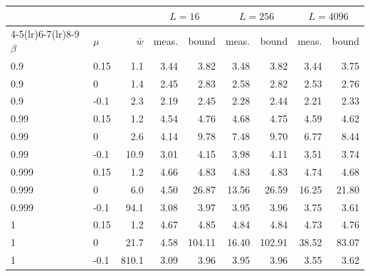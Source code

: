\begin{tabular}{llrrrrrrr}
\toprule
 & & & \multicolumn{2}{c}{$L=16$} & \multicolumn{2}{c}{$L=256$} & \multicolumn{2}{c}{$L=4096$}\\
\cmidrule(lr){4-5}\cmidrule(lr){6-7}\cmidrule(lr){8-9}
$\beta$ & $\mu$ & $\bar w$ & meas. & bound & meas. & bound & meas. & bound\\
\midrule
0.9 & 0.15 & 1.1 & 3.44 & 3.82 & 3.48 & 3.82 & 3.44 & 3.75\\
0.9 & 0 & 1.4 & 2.45 & 2.83 & 2.58 & 2.82 & 2.53 & 2.76\\
0.9 & -0.1 & 2.3 & 2.19 & 2.45 & 2.28 & 2.44 & 2.21 & 2.33\\
0.99 & 0.15 & 1.2 & 4.54 & 4.76 & 4.68 & 4.75 & 4.59 & 4.62\\
0.99 & 0 & 2.6 & 4.14 & 9.78 & 7.48 & 9.70 & 6.77 & 8.44\\
0.99 & -0.1 & 10.9 & 3.01 & 4.15 & 3.98 & 4.11 & 3.51 & 3.74\\
0.999 & 0.15 & 1.2 & 4.66 & 4.83 & 4.83 & 4.83 & 4.74 & 4.68\\
0.999 & 0 & 6.0 & 4.50 & 26.87 & 13.56 & 26.59 & 16.25 & 21.80\\
0.999 & -0.1 & 94.1 & 3.08 & 3.97 & 3.95 & 3.96 & 3.75 & 3.61\\
1 & 0.15 & 1.2 & 4.67 & 4.85 & 4.84 & 4.84 & 4.73 & 4.76\\
1 & 0 & 21.7 & 4.58 & 104.11 & 16.40 & 102.91 & 38.52 & 83.07\\
1 & -0.1 & 810.1 & 3.09 & 3.96 & 3.95 & 3.96 & 3.55 & 3.62\\
\bottomrule
\end{tabular}
